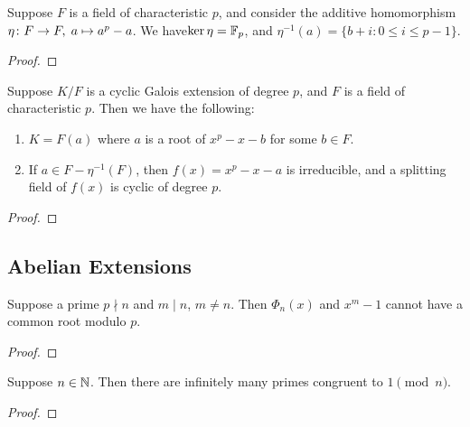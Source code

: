 \begin{proposition}
    Suppose \(F\) is a field of characteristic \(p\),
    and consider the additive homomorphism \(\eta\colon F\to F,\;a\mapsto a^p-a\).
    We have\(\ker\eta = \mathbb{F}_p\), and \(\eta^{-1}(a) = \{b+i : 0 \leq i \leq p-1\}\).
\end{proposition}
\begin{proof}
\end{proof}
\begin{theorem}
    Suppose \(K/F\) is a cyclic Galois extension of degree \(p\),
    and \(F\) is a field of characteristic \(p\).
    Then we have the following:
    \begin{enumerate}[label={(\alph*)}, itemsep=0mm]
        \item \(K = F(a)\) where \(a\) is a root of \(x^p-x-b\) for some \(b \in F\).
        \item If \(a \in F - \eta^{-1}(F)\), then \(f(x) = x^p-x-a\) is irreducible,
            and a splitting field of \(f(x)\) is cyclic of degree \(p\).
    \end{enumerate}
\end{theorem}
\begin{proof}
\end{proof}

\subsection*{Abelian Extensions}

\begin{lemma}
    Suppose a prime \(p \nmid n\) and \(m \mid n\), \(m \neq n\).
    Then \(\Phi_n(x)\) and \(x^m - 1\) cannot have a common root modulo \(p\).
\end{lemma}
\begin{proof}
\end{proof}
\begin{theorem}
    Suppose \(n \in \mathbb{N}\).
    Then there are infinitely many primes congruent to \(1 \pmod{n}\).
\end{theorem}
\begin{proof}
\end{proof}

